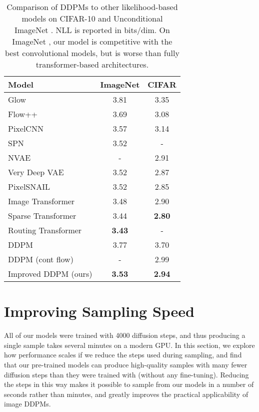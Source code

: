 \documentclass{article}
\begin{document}
\begin{table}[t]
    \caption{\label{tbl:allvlbcomparison} Comparison of DDPMs to other likelihood-based models on CIFAR-10 and Unconditional ImageNet . NLL is reported in bits/dim. On ImageNet , our model is competitive with the best convolutional models, but is worse than fully transformer-based architectures.}
    \centering
    \vskip 0.15in
	\begin{center}
	\begin{small}
    \begin{tabular}{lcc}
    	\toprule
        Model & ImageNet & CIFAR \\
        \midrule
        Glow \citep{glow} & 3.81 & 3.35 \\
        Flow++ \citep{flow++} & 3.69 & 3.08 \\
        PixelCNN \citep{pixelcnn} & 3.57 & 3.14 \\
        SPN \citep{spn} & 3.52 & - \\
        NVAE \citep{nvae} & - & 2.91 \\
        Very Deep VAE \citep{vdvae} & 3.52 & 2.87 \\
        PixelSNAIL \citep{pixelsnail} & 3.52 & 2.85 \\
        Image Transformer \citep{imagetransformer} & 3.48 & 2.90 \\
        Sparse Transformer \citep{sparsetransformer} & 3.44 & \bf 2.80 \\
        Routing Transformer \citep{routingtransformer} & \bf 3.43 & - \\
        \midrule 
        DDPM \citep{ddpm} & 3.77 & 3.70 \\
        DDPM (cont flow) \citep{sde} & - & 2.99 \\
        Improved DDPM (ours) & \bf 3.53 & \bf 2.94 \\
        \bottomrule
    \end{tabular}
    \end{small}
    \end{center}
    \vskip -0.1in
\end{table}

\section{Improving Sampling Speed}
\label{sec:numberofsteps}

All of our models were trained with 4000 diffusion steps, and thus producing a single sample takes several minutes on a modern GPU. In this section, we explore how performance scales if we reduce the steps used during sampling, and find that our pre-trained  models can produce high-quality samples with many fewer diffusion steps than they were trained with (without any fine-tuning). Reducing the steps in this way makes it possible to sample from our models in a number of seconds rather than minutes, and greatly improves the practical applicability of image DDPMs.
\end{document}
